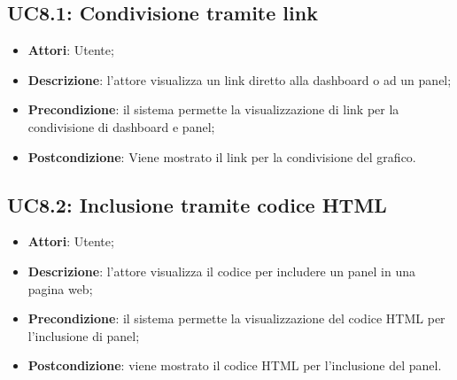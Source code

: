 \subsection{UC8.1: Condivisione tramite link}
\hypertarget{UC8.1}{}
\begin{itemize}
	\item \textbf{Attori}: Utente;
	\item \textbf{Descrizione}: l'attore visualizza un link diretto alla dashboard o ad un panel;
	\item \textbf{Precondizione}: il sistema permette la visualizzazione di link per la condivisione di dashboard e panel;
	\item \textbf{Postcondizione}: Viene mostrato il link per la condivisione del grafico.
\end{itemize}

\subsection{UC8.2: Inclusione tramite codice HTML}
\hypertarget{UC8.2}{}
\begin{itemize}
	\item \textbf{Attori}: Utente;
	\item \textbf{Descrizione}: l'attore visualizza il codice  per includere un panel in una pagina web;
	\item \textbf{Precondizione}: il sistema permette la visualizzazione del codice HTML per l'inclusione di panel;
	\item \textbf{Postcondizione}: viene mostrato il codice HTML per l'inclusione del panel.
\end{itemize}


